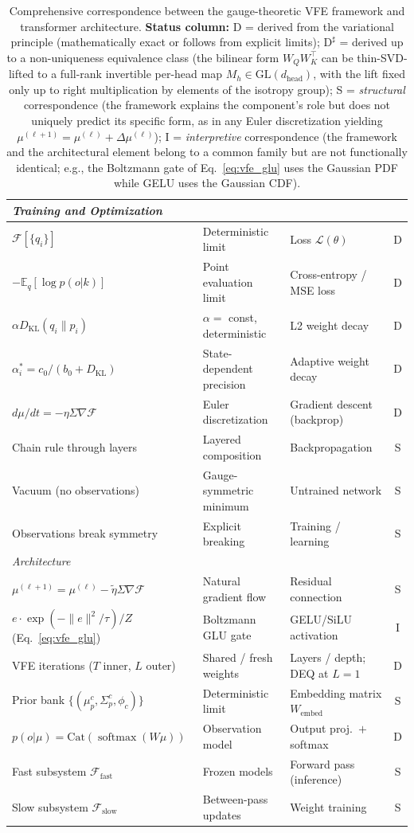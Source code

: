 \documentclass[twoside,11pt]{article}
\newcommand{\softmax}{\operatorname{softmax}}
\newcommand{\KL}{\operatorname{KL}}
\begin{document}
\begin{table}[p]
\begin{tabular}{|l|l|l|c|}
\hline
\multicolumn{4}{|l|}{\textit{Training and Optimization}} \\
\hline
$\mathcal{F}[\{q_i\}]$ & Deterministic limit & Loss $\mathcal{L}(\theta)$ & D \\
$-\mathbb{E}_q[\log p(o|k)]$ & Point evaluation limit & Cross-entropy / MSE loss & D \\
$\alpha D_{\KL}(q_i \| p_i)$ & $\alpha = $ const, deterministic & L2 weight decay & D \\
$\alpha_i^* = c_0/(b_0 + D_{\KL})$ & State-dependent precision & Adaptive weight decay & D \\
$d\mu/dt = -\eta \Sigma\nabla\mathcal{F}$ & Euler discretization & Gradient descent (backprop) & D \\
Chain rule through layers & Layered composition & Backpropagation & S \\
Vacuum (no observations) & Gauge-symmetric minimum & Untrained network & S \\
Observations break symmetry & Explicit breaking & Training / learning & S \\
\hline
\multicolumn{4}{|l|}{\textit{Architecture}} \\
\hline
$\mu^{(\ell+1)} = \mu^{(\ell)} - \tilde{\eta} \Sigma\nabla\mathcal{F}$ & Natural gradient flow & Residual connection & S \\
$e \cdot \exp(-\|e\|^2/\tau)/Z$ (Eq.~\ref{eq:vfe_glu}) & Boltzmann GLU gate & GELU/SiLU activation & I \\
VFE iterations ($T$ inner, $L$ outer) & Shared / fresh weights & Layers / depth; DEQ at $L = 1$ & D \\
Prior bank $\{(\mu_p^c, \Sigma_p^c, \phi_c)\}$ & Deterministic limit & Embedding matrix $W_{\text{embed}}$ & S \\
$p(o|\mu) = \mathrm{Cat}(\softmax(W\mu))$ & Observation model & Output proj.\ $+$ softmax & D \\
Fast subsystem $\mathcal{F}_{\text{fast}}$ & Frozen models & Forward pass (inference) & S \\
Slow subsystem $\mathcal{F}_{\text{slow}}$ & Between-pass updates & Weight training & S \\
\hline
\end{tabular}
\caption{Comprehensive correspondence between the gauge-theoretic VFE framework and transformer architecture. \textbf{Status column:} D = derived from the variational principle (mathematically exact or follows from explicit limits); $\text{D}^\sharp$ = derived up to a non-uniqueness equivalence class (the bilinear form $W_Q W_K^\top$ can be thin-SVD-lifted to a full-rank invertible per-head map $M_h \in \mathrm{GL}(d_{\text{head}})$, with the lift fixed only up to right multiplication by elements of the isotropy group); S = \emph{structural} correspondence (the framework explains the component's role but does not uniquely predict its specific form, as in any Euler discretization yielding $\mu^{(\ell+1)} = \mu^{(\ell)} + \Delta\mu^{(\ell)}$); I = \emph{interpretive} correspondence (the framework and the architectural element belong to a common family but are not functionally identical; e.g., the Boltzmann gate of Eq.~\ref{eq:vfe_glu} uses the Gaussian PDF while GELU uses the Gaussian CDF).}

\end{table}
\end{document}
